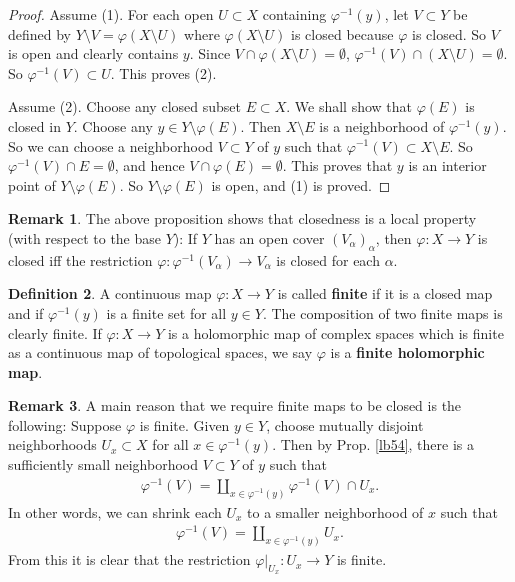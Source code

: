 \documentclass[12pt,b5paper,notitlepage]{report}
\theoremstyle{definition}
\newtheorem{df}{Definition}[section]
\newtheorem{rem}[df]{Remark}
\theoremstyle{plain}
\numberwithin{equation}{section}
\begin{document}
\begin{proof}
Assume (1). For each open $U\subset X$ containing $\varphi^{-1}(y)$, let $V\subset Y$ be defined by $Y\setminus V=\varphi(X\setminus U)$ where $\varphi(X\setminus U)$ is closed because $\varphi$ is closed. So $V$ is open and clearly contains $y$. Since $V\cap\varphi(X\setminus U)=\emptyset$, $\varphi^{-1}(V)\cap (X\setminus U)=\emptyset$. So $\varphi^{-1}(V)\subset U$. This proves (2).

Assume (2). Choose any closed subset $E\subset X$. We shall show that $\varphi(E)$ is closed in $Y$. Choose any $y\in Y\setminus\varphi(E)$. Then $X\setminus E$ is a neighborhood of $\varphi^{-1}(y)$. So we can choose a neighborhood $V\subset Y$ of $y$ such that $\varphi^{-1}(V)\subset X\setminus E$. So $\varphi^{-1}(V)\cap E=\emptyset$, and hence $V\cap \varphi(E)=\emptyset$. This proves that $y$ is an interior point of $Y\setminus\varphi(E)$. So $Y\setminus\varphi(E)$ is open, and (1) is proved.
\end{proof}



\begin{rem}\label{lb88}
The above proposition shows that closedness is a local property (with respect to the base $Y$): If $Y$ has an open cover $(V_\alpha)_\alpha$, then $\varphi:X\rightarrow Y$ is closed iff the restriction $\varphi:\varphi^{-1}(V_\alpha)\rightarrow V_\alpha$ is closed for each $\alpha$.
\end{rem}

\begin{df}
A continuous map $\varphi:X\rightarrow Y$ is called \textbf{finite} if it is a closed map and if $\varphi^{-1}(y)$ is a finite set for all $y\in Y$.  The composition of two finite maps is clearly finite. If $\varphi:X\rightarrow Y$ is a holomorphic map of complex spaces which is finite as a continuous map of topological spaces, we say $\varphi$ is a \textbf{finite holomorphic map}.
\end{df}







\begin{rem}\label{lb55}
A main reason that we require finite maps to be closed is the following: Suppose $\varphi$ is finite. Given $y\in Y$, choose mutually disjoint neighborhoods $U_x\subset X$ for all $x\in\varphi^{-1}(y)$. Then by Prop. \ref{lb54}, there is a sufficiently small neighborhood $V\subset Y$ of $y$ such that
\begin{align}
\varphi^{-1}(V)=\coprod_{x\in\varphi^{-1}(y)} \varphi^{-1}(V)\cap U_x.\label{eq28}
\end{align}
In other words, we can shrink each $U_x$ to a smaller neighborhood of $x$ such that
\begin{align}
\varphi^{-1}(V)=\coprod_{x\in\varphi^{-1}(y)}U_x.\label{eq29}
\end{align}
From this it is clear that the restriction $\varphi|_{U_x}:U_x\rightarrow Y$ is finite.
\end{rem}
\end{document}
